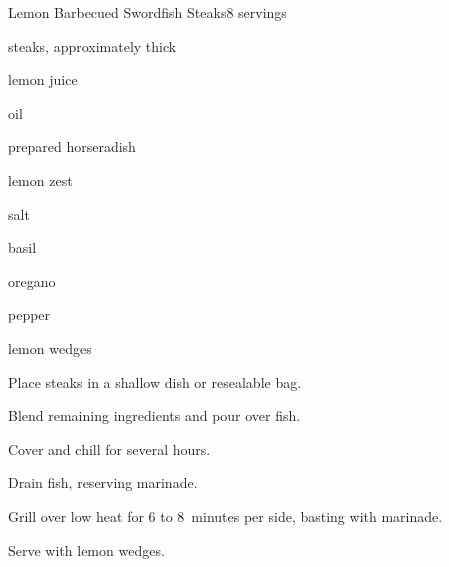 \begin{recipe}{Lemon Barbecued Swordfish Steaks}{}{8 servings}

\begin{ingredients}
\item {}  steaks, approximately  thick
\item \C{\threequarter} lemon juice
\item \C{\threequarter} oil
\item {} prepared horseradish
\item {} lemon zest
\item \tp{1\half} salt
\item \tp{\half} basil
\item \tp{\half} oregano
\item \tp{\half} pepper
\item lemon wedges
\end{ingredients}

\begin{directions}
\item Place steaks in a shallow dish or resealable bag.
\item Blend remaining ingredients and pour over fish.
\item Cover and chill for several hours.
\item Drain fish, reserving marinade.
\item Grill over low heat for 6 to 8~minutes per side, basting with marinade.
\item Serve with lemon wedges.
\end{directions}

\end{recipe}
